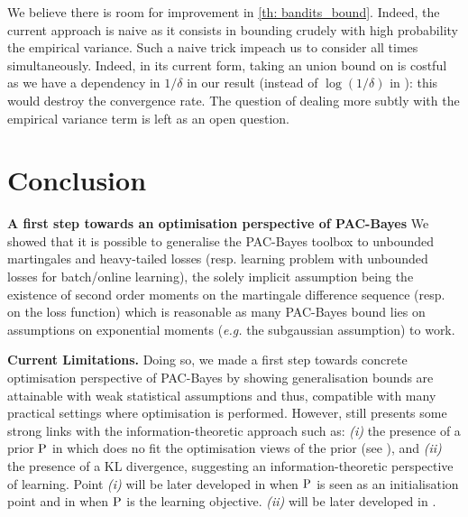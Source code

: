 We believe there is room for improvement in \cref{th: bandits_bound}. Indeed, the current approach is naive as it consists in bounding crudely with high probability the empirical variance. Such a naive trick impeach us to consider all times simultaneously. Indeed, in its current form, taking an union bound on  is costful as we have a dependency in $1/\delta$ in our result (instead of $\log(1/\delta)$ in \citealp{seldin2012bandit}): this would destroy the convergence rate. The question of dealing more subtly with the empirical variance term is left as an open question.

\section{Conclusion}

\textbf{A first step towards an optimisation perspective of PAC-Bayes} We showed that it is possible to generalise the PAC-Bayes toolbox to unbounded martingales and heavy-tailed losses (resp. learning problem with unbounded losses for batch/online learning), the solely implicit assumption being the existence of second order moments on the martingale difference sequence (resp. on the loss function) which is reasonable as many PAC-Bayes bound lies on assumptions on exponential moments (\emph{e.g.} the subgaussian assumption) to work.

\textbf{Current Limitations.} Doing so, we made a first step towards concrete optimisation perspective of PAC-Bayes by showing generalisation bounds are attainable with weak statistical assumptions and thus, compatible with many practical settings where optimisation is performed. However,  still presents some strong links with the information-theoretic approach such as: \textit{(i)} the presence of a prior $\P$ in  which does no fit the optimisation views of the prior (see ), and \textit{(ii)} the presence of a KL divergence, suggesting an information-theoretic perspective of learning. Point \textit{(i)} will be later developed in  when $\P$ is seen as an initialisation point and in  when $\P$ is the learning objective. \textit{(ii)} will be later developed in . 

